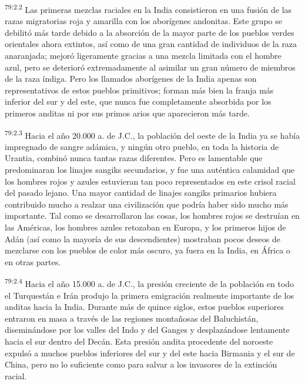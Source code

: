 \par
\textsuperscript{79:2.2} Las primeras mezclas raciales en la India consistieron en una fusión de las razas migratorias roja y amarilla con los aborígenes andonitas. Este grupo se debilitó más tarde debido a la absorción de la mayor parte de los pueblos verdes orientales ahora extintos, así como de una gran cantidad de individuos de la raza anaranjada; mejoró ligeramente gracias a una mezcla limitada con el hombre azul, pero se deterioró extremadamente al asimilar un gran número de miembros de la raza índiga. Pero los llamados aborígenes de la India apenas son representativos de estos pueblos primitivos; forman más bien la franja más inferior del sur y del este, que nunca fue completamente absorbida por los primeros anditas ni por sus primos arios que aparecieron más tarde.

\par
\textsuperscript{79:2.3} Hacia el año 20.000 a. de J.C., la población del oeste de la India ya se había impregnado de sangre adámica, y ningún otro pueblo, en toda la historia de Urantia, combinó nunca tantas razas diferentes. Pero es lamentable que predominaran los linajes sangiks secundarios, y fue una auténtica calamidad que los hombres rojos y azules estuvieran tan poco representados en este crisol racial del pasado lejano. Una mayor cantidad de linajes sangiks primarios hubiera contribuido mucho a realzar una civilización que podría haber sido mucho más importante. Tal como se desarrollaron las cosas, los hombres rojos se destruían en las Américas, los hombres azules retozaban en Europa, y los primeros hijos de Adán (así como la mayoría de sus descendientes) mostraban pocos deseos de mezclarse con los pueblos de color más oscuro, ya fuera en la India, en África o en otras partes.

\par
\textsuperscript{79:2.4} Hacia el año 15.000 a. de J.C., la presión creciente de la población en todo el Turquestán e Irán produjo la primera emigración realmente importante de los anditas hacia la India. Durante más de quince siglos, estos pueblos superiores entraron en masa a través de las regiones montañosas del Baluchistán, diseminándose por los valles del Indo y del Ganges y desplazándose lentamente hacia el sur dentro del Decán. Esta presión andita procedente del noroeste expulsó a muchos pueblos inferiores del sur y del este hacia Birmania y el sur de China, pero no lo suficiente como para salvar a los invasores de la extinción racial.

